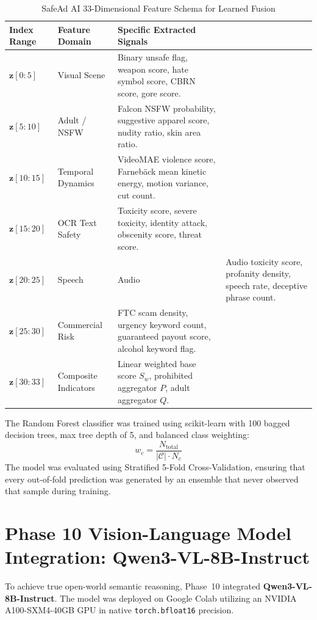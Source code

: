 \documentclass[12pt,a4paper]{report}
\begin{document}
\begin{table}[htbp]
\centering
\small
\caption{SafeAd AI 33-Dimensional Feature Schema for Learned Fusion}
\label{tab:feature_schema}
\begin{tabular}{|l|p{4.2cm}|p{7.5cm}|}
\hline
\textbf{Index Range} & \textbf{Feature Domain} & \textbf{Specific Extracted Signals} \\
\hline
$\mathbf{z}[0:5]$ & Visual Scene & Binary unsafe flag, weapon score, hate symbol score, CBRN score, gore score. \\
\hline
$\mathbf{z}[5:10]$ & Adult / NSFW & Falcon NSFW probability, suggestive apparel score, nudity ratio, skin area ratio. \\
\hline
$\mathbf{z}[10:15]$ & Temporal Dynamics & VideoMAE violence score, Farneb\"{a}ck mean kinetic energy, motion variance, cut count. \\
\hline
$\mathbf{z}[15:20]$ & OCR Text Safety & Toxicity score, severe toxicity, identity attack, obscenity score, threat score. \\
\hline
$\mathbf{z}[20:25]$ & Speech & Audio & Audio toxicity score, profanity density, speech rate, deceptive phrase count. \\
\hline
$\mathbf{z}[25:30]$ & Commercial Risk & FTC scam density, urgency keyword count, guaranteed payout score, alcohol keyword flag. \\
\hline
$\mathbf{z}[30:33]$ & Composite Indicators & Linear weighted base score $S_w$, prohibited aggregator $P$, adult aggregator $Q$. \\
\hline
\end{tabular}
\end{table}

The Random Forest classifier was trained using scikit-learn with 100 bagged decision trees, max tree depth of 5, and balanced class weighting:
\begin{equation}
w_c = \frac{N_{\text{total}}}{|\mathcal{C}| \cdot N_c}
\end{equation}
The model was evaluated using Stratified 5-Fold Cross-Validation, ensuring that every out-of-fold prediction was generated by an ensemble that never observed that sample during training.

\section{Phase 10 Vision-Language Model Integration: Qwen3-VL-8B-Instruct}

To achieve true open-world semantic reasoning, Phase~10 integrated \textbf{Qwen3-VL-8B-Instruct}. The model was deployed on Google Colab utilizing an NVIDIA A100-SXM4-40GB GPU in native \texttt{torch.bfloat16} precision.
\end{document}
